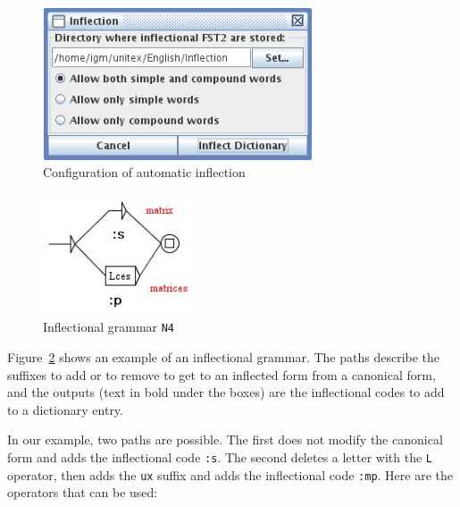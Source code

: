 \bigskip
\begin{figure}[h]
\begin{center}
\includegraphics[width=8cm]{resources/img/fig3-7.png}
\caption{Configuration of automatic inflection\label{fig-inflection-configuration}}
\end{center}
\end{figure}

\bigskip
\begin{figure}[h]
\begin{center}
\includegraphics[width=4.5cm]{resources/img/fig3-8.png}
\caption{Inflectional grammar
\texttt{N4}\label{fig-example-inflectional-grammar}}
\end{center}
\end{figure}

\bigskip
\noindent Figure~\ref{fig-example-inflectional-grammar} shows an example of an
inflectional grammar. The paths describe the suffixes to add or to remove to
get to an inflected form from a canonical form, and the outputs (text in bold under the boxes) are the
inflectional codes to add to a dictionary entry.

\bigskip
\noindent In our example, two paths are possible. The first does not modify the
canonical form and adds the inflectional code \verb+:s+. The second deletes a letter with
the \verb+L+ operator, then adds the \verb+ux+ suffix and adds the inflectional
code \verb+:mp+. Here are the operators that can be used:

